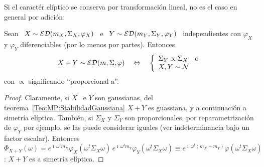 Si el caract\'er el\'iptico se conserva por transformaci\'on lineal, no es el caso en general por adici\'on:
%
\begin{teorema}
  Sean   \    $X   \sim   \mathcal{ED}(m_X,\Sigma_X,\varphi_X)$    \   e   \    $Y   \sim
  \mathcal{ED}(m_Y,\Sigma_Y,\varphi_Y)$  \ independientes  con $\varphi_X$  y $\varphi_Y$
  diferenciables (por lo menos por partes). Entonces
  \[
  X + Y \sim \mathcal{ED}(m,\Sigma,\varphi) \quad \Leftrightarrow \quad \left\{
    \begin{array}{l}  \Sigma_Y  \propto  \Sigma_X  \quad \mbox{o}\\  X,  Y  \sim
      \mathcal{N} \end{array} \right.
  \]
  con $\propto$ significando ``proporcional a''.
  \end{teorema}
\begin{proof}
  Claramente,     si     $X$     \     e     $Y$     son     gaussianas,     del
  teorema~\ref{Teo:MP:StabilidadGaussiana}    $X+Y$    es    guassiana,   y    a
  continuaci\'on a simetr\'ia el\'iptica.  Tambi\'en, si $\Sigma_X$ y $\Sigma_Y$
  son proporcionales, por reparametrizaci\'on de $\varphi_Y$ por ejemplo, se las
  puede  considerar  iguales  (ver  indeterminancia  bajo  un  factor  escalar).
  Entonces  $\Phi_{X+Y}(\omega)  = e^{\imath  \,  \omega^t m_X}  \varphi_X\left(
    \omega^t   \Sigma_X   \omega\right)    \,   e^{\imath   \,   \omega^t   m_Y}
  \varphi_Y\left( \omega^t  \Sigma_X \omega\right) \equiv  e^{\imath \, \omega^t
    (m_X+m_Y)}  \varphi\left(  \omega^t  \Sigma_X  \omega\right)$:  $X+Y$  es  a
  simetr\'ia el\'iptica.


\end{proof}
